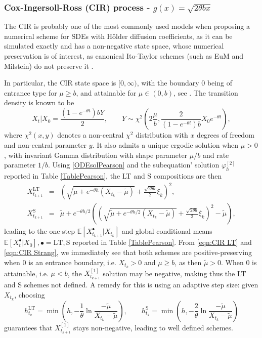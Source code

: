 \documentclass[a4paper,12pt]{article}
\numberwithin{equation}{section}
\theoremstyle{plain}
\theoremstyle{definition}
\begin{document}
\subsubsection{Cox-Ingersoll-Ross (CIR) process - $g(x)=\sqrt{2\theta b x}$}

The CIR is probably one of the most commonly used models when proposing a numerical scheme for SDEs with H\"older diffusion coefficients, as it can be simulated exactly and has a non-negative state space, whose numerical preservation is of interest, as canonical Ito-Taylor schemes (such as EuM and Milstein) do not preserve it \cite{kelly_adaptive_2023}. 

In particular, the CIR state space is $[0,\infty)$, with the boundary $0$ being of entrance type for $\mu\geq b$, and attainable for $\mu\in(0,b)$, see \cite{forman_pearson_2008}.  The transition density is known to be 
\begin{equation}\label{fCIR}
X_t|X_0 = \frac{(1-e^{-\theta t})bY}{2},\qquad Y\sim \chi^2\left(2\frac{\mu}{b},\frac{2}{(1-e^{-\theta t})b}X_0e^{-\theta t}\right),
\end{equation}
where $\chi^2(x,y)$ denotes a non-central $\chi^2$ distribution with $x$ degrees of freedom and non-central parameter $y$. 
It also admits a unique ergodic solution  when $\mu>0$, with invariant Gamma distribution with shape parameter $\mu/b$ and rate parameter $1/b$. Using \eqref{ODEsolPearson} and the subequation' solution $\varphi^{[2]}_h$ reported in Table \ref{TablePearson}, the LT  and S compositions are then
\begin{eqnarray}
\label{eqn:CIR LT}X^{\textrm{LT}}_{t_{k+1}}&=& \left(\sqrt{\tilde\mu+e^{-\theta h}(X_{t_k}-\tilde\mu)}+\frac{\sqrt{2\theta b}}{2}\xi_k\right)^2,\\
X^{\textrm{S}}_{t_{k+1}}\label{eqn:CIR Strang}&=& \tilde\mu +e^{-\theta h/2}\left(\left(\sqrt{\tilde\mu+e^{-\theta h/2}(X_{t_k}-\tilde\mu)}+\frac{\sqrt{2\theta b}}{2}\xi_k\right)^2-\tilde \mu\right),
\end{eqnarray}
leading to the one-step $\mathbb{E}[X^\bullet_{t_{k+1}}|X_{t_k}]$ and  global conditional means $\mathbb{E}[X^\bullet_{t}|X_{0}], \bullet=\textrm{LT}, \textrm{S}$ reported in Table \ref{TablePearson}. From \eqref{eqn:CIR LT} and \eqref{eqn:CIR Strang}, we immediately see that both schemes are positive-preserving when $0$ is an entrance boundary, i.e. 
$X_{t_k}>0$ and $\mu\geq b$, as then $\tilde\mu>0$.  When 0 is attainable, i.e. $\mu<b$, the $X^{[1]}_{t_{k+1}}$ solution may be negative, making thus the LT and S schemes not defined. A remedy for this is using an adaptive step size: given $X_{t_k}$, choosing
\begin{equation*}
    h^{\textrm{LT}}_{t_k}=\min\left(h,-\frac{1}{\theta}\ln{\frac{-\tilde{\mu}}{X_{t_k}-\tilde{\mu}}}\right),\qquad  h^{\textrm{S}}_{t_k}=\min\left(h,-\frac{2}{\theta}\ln{\frac{-\tilde{\mu}}{X_{t_k}-\tilde{\mu}}}\right)
\end{equation*}
guarantees that $X^{[1]}_{t_{k+1}}$ stays non-negative, leading to well defined schemes.
\end{document}
